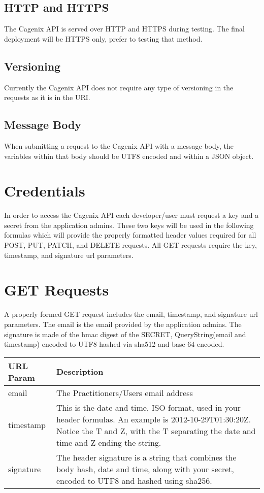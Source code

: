 \documentclass[letterpaper,10pt,english]{sphinxmanual}
\begin{document}
\subsection{HTTP and HTTPS}
\label{dev-api-overview:http-and-https}
The Cagenix API is served over HTTP and HTTPS during testing. The final
deployment will be HTTPS only, prefer to testing that method.


\subsection{Versioning}
\label{dev-api-overview:versioning}
Currently the Cagenix API does not require any type of versioning in the
requests as it is in the URI.


\subsection{Message Body}
\label{dev-api-overview:message-body}
When submitting a request to the Cagenix API with a message body, the
variables within that body should be UTF8 encoded and within a JSON object.


\section{Credentials}
\label{dev-api-overview:credentials}
In order to access the Cagenix API each developer/user must request a key and
a secret from the application admins. These two keys will be used in the
following formulas which will provide the properly formatted header values
required for all POST, PUT, PATCH, and DELETE requests. All GET requests require
the key, timestamp, and signature url parameters.


\section{GET Requests}
\label{dev-api-overview:get-requests}
A properly formed GET request includes the email, timestamp, and signature url
parameters. The email is the email provided by the application admins.  The
signature is made of the hmac digest of the SECRET, QueryString(email and timestamp) encoded to
UTF8 hashed via sha512 and base 64 encoded.

\begin{tabulary}{\linewidth}{|L|L|}
\hline
\textsf{\relax 
URL Param
} & \textsf{\relax 
Description
}\\
\hline
email
 & 
The Practitioners/Users email address
\\

timestamp
 & 
This is the date and time, ISO format, used in your
header formulas. An example is 2012-10-29T01:30:20Z.
Notice the T and Z, with the T separating the date and
time and Z ending the string.
\\

signature
 & 
The header signature is a string that combines the body
hash, date and time, along with your secret, encoded to
UTF8 and hashed using sha256.
\\
\hline\end{tabulary}
\end{document}
